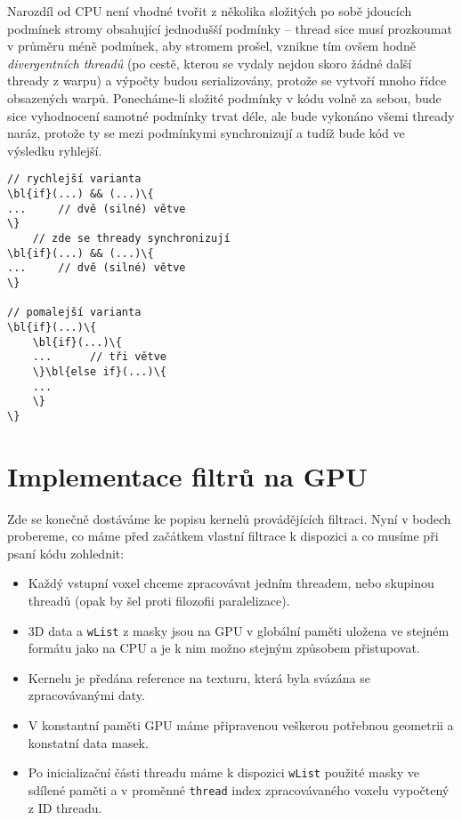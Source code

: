         Narozdíl od CPU není vhodné tvořit z několika složitých po sobě jdoucích podmínek stromy obsahující jednodušší podmínky -- thread sice musí prozkoumat v průměru méně podmínek, aby stromem prošel, vznikne tím ovšem hodně \emph{divergentních threadů} (po cestě, kterou se vydaly nejdou skoro žádné další thready z warpu) a výpočty budou serializovány, protože se vytvoří mnoho řídce obsazených warpů. Ponecháme-li složité podmínky v kódu volně za sebou, bude sice vyhodnocení samotné podmínky trvat déle, ale bude vykonáno všemi thready naráz, protože ty se mezi podmínkymi synchronizují a tudíž bude kód ve výsledku ryhlejší.
        \begin{Verbatim}[commandchars = \\\{\}]
// rychlejší varianta
\bl{if}(...) && (...)\{
...     // dvě (silné) větve
\}
    // zde se thready synchronizují
\bl{if}(...) && (...)\{
...     // dvě (silné) větve
\}

// pomalejší varianta
\bl{if}(...)\{
    \bl{if}(...)\{
    ...      // tři větve
    \}\bl{else if}(...)\{
    ...
    \}
\}
        \end{Verbatim}

\section{Implementace filtrů na GPU}

    Zde se konečně dostáváme ke popisu kernelů provádějících filtraci. Nyní v bodech probereme, co máme před začátkem vlastní filtrace k dispozici a co musíme při psaní kódu zohlednit:
    \begin{itemize}
      \item Každý vstupní voxel chceme zpracovávat jedním threadem, nebo skupinou threadů (opak by šel proti filozofii paralelizace).
      \item 3D data a {\tt wList} z masky jsou na GPU v globální paměti uložena ve stejném formátu jako na CPU a je k nim možno stejným způsobem přistupovat.
      \item Kernelu je předána reference na texturu, která byla svázána se zpracovávanými daty.
      \item V konstantní paměti GPU máme připravenou veškerou potřebnou geometrii a konstatní data masek.
      \item Po inicializační části threadu máme k dispozici {\tt wList} použité masky ve sdílené paměti a v proměnné {\tt thread} index zpracovávaného voxelu vypočtený z ID threadu.
    \end{itemize}

